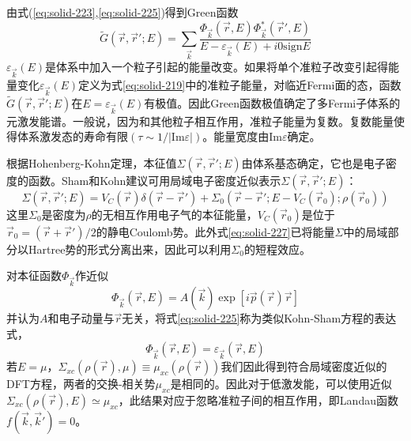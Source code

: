 由式(\ref{eq:solid-223},\ref{eq:solid-225})得到Green函数
\begin{equation}
  \tilde G(\vec r,\vec r';E)=\sum_{\vec k}\frac{\Phi_{\vec k}(\vec r,E)\Phi_{\vec k}^{\ast}(\vec r',E)}{E-\varepsilon_{\vec k}(E)+i0\mathrm{sign}E}
  \label{eq:solid-226}
\end{equation}
$\varepsilon_{\vec k}(E)$是体系中加入一个粒子引起的能量改变。如果将单个准粒子改变引起得能量变化$\varepsilon_{\vec k}(E)$定义为式\eqref{eq:solid-219}中的准粒子能量，对临近Fermi面的态，函数$\tilde G(\vec r,\vec r';E)$在$E=\varepsilon_{\vec k}(E)$有极值。因此Green函数极值确定了多Fermi子体系的元激发能谱。一般说，因为和其他粒子相互作用，准粒子能量为复数。复数能量使得体系激发态的寿命有限$(\tau\sim1/|\mathrm{Im}\varepsilon|)$\cite{Landau-Lifshitz}。能量宽度由$\mathrm{Im}\varepsilon$确定。


根据Hohenberg-Kohn定理，本征值$\Sigma(\vec r,\vec r';E)$由体系基态确定，它也是电子密度的函数。Sham和Kohn建议可用局域电子密度近似表示$\Sigma(\vec r,\vec r';E)$\cite{PR145-561_1966}：
\begin{equation}
  \Sigma(\vec r,\vec r';E)=V_C(\vec r)\delta(\vec r-\vec r')+\Sigma_0(\vec r-\vec r';E-V_C(\vec r_0);\rho(\vec r_0))
  \label{eq:solid-227}
\end{equation}
这里$\Sigma_0$是密度为$\rho$的无相互作用电子气的本征能量，$V_C(\vec r_0)$是位于$\vec r_0=(\vec r+\vec r')/2$的静电Coulomb势。此外式\eqref{eq:solid-227}已将能量$\Sigma$中的局域部分以Hartree势的形式分离出来，因此可以利用$\Sigma_0$的短程效应。

对本征函数$\Phi_{\vec k}$作近似
$$\Phi_{\vec k}(\vec r,E)=A(\vec k)\exp[i\vec p(\vec r)\vec r]$$
并认为$A$和电子动量与$\vec r$无关，将式\eqref{eq:solid-225}称为类似Kohn-Sham方程的表达式\cite{JPC4-2064_1971}，
\begin{equation}
  [-\nabla^2+V_C(\vec r)+\Sigma_{xc}(\rho(\vec r),E)]\Phi_{\vec k}(\vec r,E)=\varepsilon_{\vec k}(\vec r,E)
  \label{eq:solid-228}
\end{equation}
若$E=\mu$，$\Sigma_{xc}(\rho(\vec r),\mu)\equiv\mu_{xc}(\rho(\vec r))$我们因此得到符合局域密度近似的DFT方程，两者的交换-相关势$\mu_{xc}$是相同的。因此对于低激发能，可以使用近似$\Sigma_{xc}(\rho(\vec r),E)\simeq\mu_{xc}$，此结果对应于忽略准粒子间的相互作用，即Landau函数$f(\vec k,\vec k')=0$。

